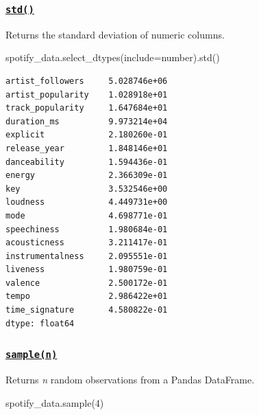 \documentclass[
  letterpaper,
  DIV=11,
  numbers=noendperiod]{scrreprt}
\newenvironment{Shaded}{\begin{snugshade}}{\end{snugshade}}
\newcommand{\DecValTok}[1]{\textcolor[rgb]{0.68,0.00,0.00}{#1}}
\newcommand{\NormalTok}[1]{\textcolor[rgb]{0.00,0.23,0.31}{#1}}
\newcommand{\OperatorTok}[1]{\textcolor[rgb]{0.37,0.37,0.37}{#1}}
\newcommand{\StringTok}[1]{\textcolor[rgb]{0.13,0.47,0.30}{#1}}
\begin{document}
\hypertarget{std}{%
\subsubsection{\texorpdfstring{\href{https://pandas.pydata.org/docs/reference/api/pandas.DataFrame.std.html}{\texttt{std()}}}{std()}}\label{std}}

Returns the standard deviation of numeric columns.

\begin{Shaded}
\begin{Highlighting}[]
\NormalTok{spotify\_data.select\_dtypes(include}\OperatorTok{=}\StringTok{\textquotesingle{}number\textquotesingle{}}\NormalTok{).std()}
\end{Highlighting}
\end{Shaded}

\begin{verbatim}
artist_followers     5.028746e+06
artist_popularity    1.028918e+01
track_popularity     1.647684e+01
duration_ms          9.973214e+04
explicit             2.180260e-01
release_year         1.848146e+01
danceability         1.594436e-01
energy               2.366309e-01
key                  3.532546e+00
loudness             4.449731e+00
mode                 4.698771e-01
speechiness          1.980684e-01
acousticness         3.211417e-01
instrumentalness     2.095551e-01
liveness             1.980759e-01
valence              2.500172e-01
tempo                2.986422e+01
time_signature       4.580822e-01
dtype: float64
\end{verbatim}

\hypertarget{samplen}{%
\subsubsection{\texorpdfstring{\href{https://pandas.pydata.org/docs/reference/api/pandas.DataFrame.sample.html}{\texttt{sample(n)}}}{sample(n)}}\label{samplen}}

Returns \emph{n} random observations from a Pandas DataFrame.

\begin{Shaded}
\begin{Highlighting}[]
\NormalTok{spotify\_data.sample(}\DecValTok{4}\NormalTok{)}
\end{Highlighting}
\end{Shaded}
\end{document}
